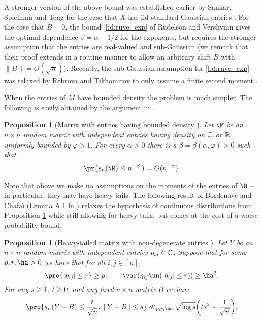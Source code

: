 \documentclass[aop,preprint]{imsart}
\theoremstyle{plain}
\newtheorem{proposition}[theorem]{Proposition}
\theoremstyle{definition}
\theoremstyle{remark}
\numberwithin{equation}{section}
\numberwithin{theorem}{section}
\begin{document}
A stronger version of the above bound was established earlier by Sankar, Spielman and Teng for the case that $X$ has iid standard Gaussian entries \citep{SST:smoothed}.
For the case that $B=0$, the bound \eqref{bd:ruve_exp} of Rudelson and Vershynin gives the optimal dependence $\beta = \alpha +1/2$ for the exponents, but requires the stronger assumption that the entries are real-valued and sub-Gaussian (we remark that their proof extends in a routine manner to allow an arbitrary shift $B$ with $\|B\|=O(\sqrt{n})$). 
Recently, the sub-Gaussian assumption for \eqref{bd:ruve_exp} was relaxed by Rebrova and Tikhomirov to only assume a finite second moment \citep{ReTi}.

When the entries of $M$ have bounded density the problem is much simpler.
The following is easily obtained by the argument in \cite[Section 4.4]{BoCh:survey}.

\begin{proposition}[Matrix with entries having bounded density \citep{BoCh:survey}]	\label{prop:bdd}
Let $\M$ be an $n\times n$ random matrix with independent entries having density on ${\mathbb C}$ or ${\mathbb R}$ uniformly bounded by $\varphi> 1$.
For every $\alpha>0$ there is a $\beta=\beta(\alpha,\varphi)>0$ such that
\begin{equation}
\pr\big( s_n(\M) \le n^{-\beta}\,\big) = O(n^{-\alpha}).
\end{equation}
\end{proposition}

Note that above we make no assumptions on the moments of the entries of $\M$ -- in particular, they may have heavy tails. 
The following result of Bordenave and Chafa\"i (Lemma A.1 in \citep{BoCh:survey}) relaxes the hypothesis of continuous distributions from Proposition \ref{prop:bdd} while still allowing for heavy tails, but comes at the cost of a worse probability bound.

\begin{proposition}[Heavy-tailed matrix with non-degenerate entries {\citep{BoCh:survey}}]		\label{prop:BoCh}
Let $Y$ be an $n\times n$ random matrix with independent entries $\eta_{ij}\in {\mathbb C}$.
Suppose that for some $p,r,\ha>0$ we have that for all $i,j\in [n]$,
\begin{equation}	\label{BoCh:nondeg}
\pro{ |\eta_{ij}|\le r} \ge p, \quad\quad \var( \eta_{ij}\un(|\eta_{ij}|\le r)) \ge \ha^2.
\end{equation}
For any $s\ge1$, $t\ge 0$, and any fixed $n\times n$ matrix $B$ we have
\begin{equation}
\pro{ s_n(Y+B) \le \frac{t}{\sqrt{n}}, \; \|Y+B\| \le s} \ll_{p,r,\ha} \sqrt{\log s}\bigg(ts^2 + \frac{1}{\sqrt{n}}\bigg).
\end{equation}
\end{proposition}
\end{document}
